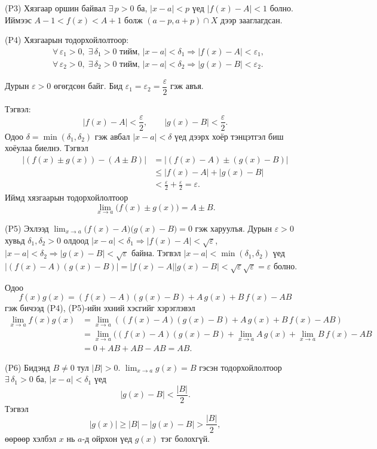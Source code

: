 \begin{prof}
(P3) Хязгаар оршин байвал $\exists\,p>0$ ба, $|x-a|<p$ үед $|f(x)-A|<1$ болно. Иймээс $A-1<f(x)<A+1$ болж $(a-p,a+p)\cap X$ дээр зааглагдсан.

(P4) Хязгаарын тодорхойлолтоор:
\begin{align*}
&\forall\,\varepsilon_1>0,\;\exists\,\delta_1>0\text{ тийм, }|x-a|<\delta_1\Rightarrow |f(x)-A|<\varepsilon_1,\\
&\forall\,\varepsilon_2>0,\;\exists\,\delta_2>0\text{ тийм, }|x-a|<\delta_2\Rightarrow |g(x)-B|<\varepsilon_2.
\end{align*}

Дурын $\varepsilon>0$ өгөгдсөн байг.  
Бид $\varepsilon_1=\varepsilon_2=\dfrac{\varepsilon}{2}$ гэж авъя.

Тэгвэл:
\[
|f(x)-A|<\frac{\varepsilon}{2},\qquad |g(x)-B|<\frac{\varepsilon}{2}.
\]
Одоо $\delta=\min(\delta_1,\delta_2)$ гэж авбал $|x-a|<\delta$ үед дээрх хоёр тэнцэтгэл биш хоёулаа биелнэ.  
Тэгвэл
\begin{align*}
|(f(x)\pm g(x))-(A\pm B)|
&=|(f(x)-A)\pm(g(x)-B)|\\
&\le |f(x)-A|+|g(x)-B|\\
&<\frac{\varepsilon}{2}+\frac{\varepsilon}{2}=\varepsilon.
\end{align*}
Иймд хязгаарын тодорхойлолтоор
\[
\lim_{x\to a}\bigl(f(x)\pm g(x)\bigr)=A\pm B.
\]

(P5) Эхлээд $\displaystyle\lim_{x\to a}\bigl(f(x)-A\bigr)\bigl(g(x)-B\bigr)=0$ гэж харуулъя. Дурын $\varepsilon>0$ хувьд $\delta_1,\delta_2>0$ олдоод $|x-a|<\delta_1\Rightarrow |f(x)-A|<\sqrt{\varepsilon}$, $|x-a|<\delta_2\Rightarrow |g(x)-B|<\sqrt{\varepsilon}$ байна. Тэгвэл $|x-a|<\min(\delta_1,\delta_2)$ үед 
$|(f(x)-A)(g(x)-B)|=|f(x)-A||g(x)-B|<\sqrt{\varepsilon}\sqrt{\varepsilon}=\varepsilon$ болно.

Одоо
\[
f(x)g(x)=(f(x)-A)(g(x)-B)+A\,g(x)+B\,f(x)-AB
\]
гэж бичээд (P4), (P5)-ийн эхний хэсгийг хэрэглэвэл 
\begin{align*}
\lim_{x\to a}f(x)g(x)&=\lim_{x\to a}\left((f(x)-A)(g(x)-B)+A\,g(x)+B\,f(x)-AB\right)\\
&=\lim_{x\to a}((f(x)-A)(g(x)-B)+\lim_{x\to a}A\,g(x)+\lim_{x\to a} B\,f(x)-AB\\
&=0+AB+AB-AB=AB
.
\end{align*}

(P6)  Бидэнд $B\neq 0$ тул $|B|>0$.  
$\displaystyle\lim_{x\to a}g(x)=B$ гэсэн тодорхойлолтоор $\exists\,\delta_1>0$ ба, $|x-a|<\delta_1$ үед
\[
|g(x)-B|<\frac{|B|}{2}.
\]
Тэгвэл 
\[
|g(x)|\ge |B|-|g(x)-B|>\frac{|B|}{2},
\]
өөрөөр хэлбэл $x$ нь $a$-д ойрхон үед $g(x)$ тэг болохгүй.


\end{prof}
